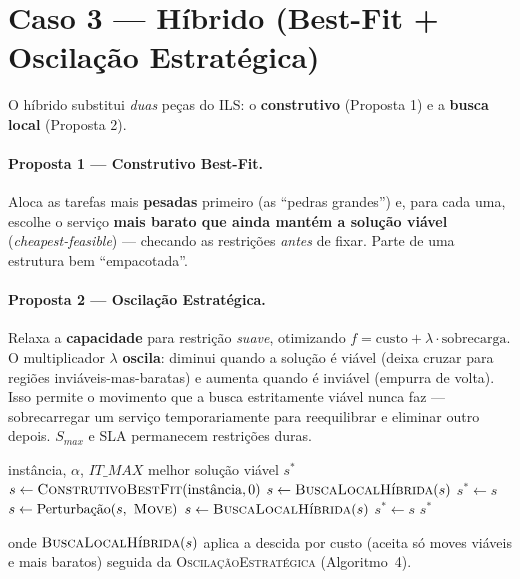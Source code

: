 \documentclass{article}
\begin{document}
\section{Caso 3 --- Híbrido (Best-Fit + Oscilação Estratégica)}

O híbrido substitui \emph{duas} peças do ILS: o \textbf{construtivo} (Proposta 1) e a
\textbf{busca local} (Proposta 2).

\paragraph{Proposta 1 --- Construtivo Best-Fit.} Aloca as tarefas mais \textbf{pesadas} primeiro
(as ``pedras grandes'') e, para cada uma, escolhe o serviço \textbf{mais barato que ainda mantém
a solução viável} (\textit{cheapest-feasible}) --- checando as restrições \emph{antes} de fixar.
Parte de uma estrutura bem ``empacotada''.

\paragraph{Proposta 2 --- Oscilação Estratégica.} Relaxa a \textbf{capacidade} para restrição
\emph{suave}, otimizando $f = \text{custo} + \lambda \cdot \text{sobrecarga}$. O multiplicador
$\lambda$ \textbf{oscila}: diminui quando a solução é viável (deixa cruzar para regiões
inviáveis-mas-baratas) e aumenta quando é inviável (empurra de volta). Isso permite o movimento
que a busca estritamente viável nunca faz --- sobrecarregar um serviço temporariamente para
reequilibrar e eliminar outro depois. $S_{max}$ e SLA permanecem restrições duras.

\begin{algorithm}[H]
\caption{ILS Híbrido (Caso 3)}
\begin{algorithmic}[1]
\Require instância, $\alpha$, $IT\_MAX$
\Ensure melhor solução viável $s^*$
\State $s \leftarrow \textsc{ConstrutivoBestFit}(\text{instância}, 0)$
\State $s \leftarrow \textsc{BuscaLocalHíbrida}(s)$
\State $s^* \leftarrow s$
    \State $s \leftarrow \text{Perturbação}(s,\ \textsc{Move})$
    \State $s \leftarrow \textsc{BuscaLocalHíbrida}(s)$
        \State $s^* \leftarrow s$
    \EndIf
\EndFor
\State \Return $s^*$
\end{algorithmic}
\end{algorithm}

\noindent onde $\textsc{BuscaLocalHíbrida}(s)$ aplica a descida por custo (aceita só moves viáveis
e mais baratos) seguida da \textsc{OscilaçãoEstratégica} (Algoritmo~4).
\end{document}
